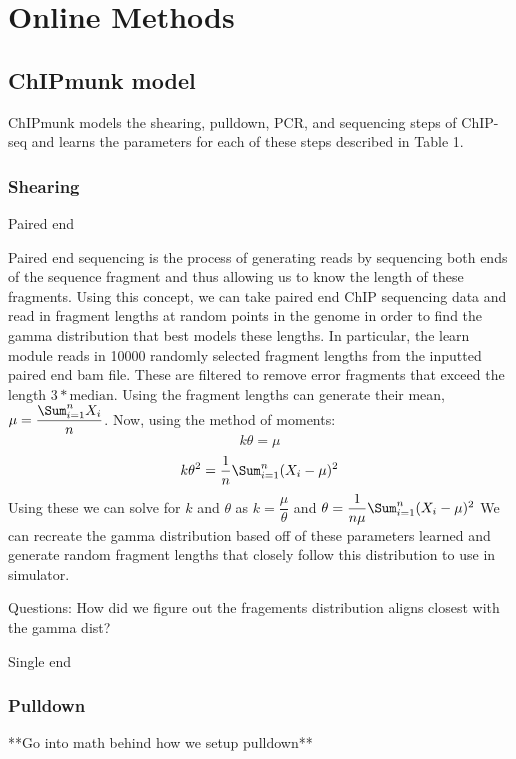 \documentclass[12pt]{article}
\begin{document}
\section*{Online Methods}

\subsection*{ChIPmunk model}

ChIPmunk models the shearing, pulldown, PCR, and sequencing steps of ChIP-seq and learns the parameters for each of these steps described in Table 1. 

\subsubsection*{Shearing}

Paired end

Paired end sequencing is the process of generating reads by sequencing both ends of the sequence fragment and thus allowing us to know the length of these fragments. Using this concept, we can take paired end ChIP sequencing data and read in fragment lengths at random points in the genome in order to find the gamma distribution that best models these lengths. In particular, the learn module reads in 10000 randomly selected fragment lengths from the inputted paired end bam file. These are filtered to remove error fragments that exceed the length $3 * \text{median}$. Using the fragment lengths can generate their mean, $\mu = \dfrac{\Sum_{i=1}^{n}X_i}{n}$. Now, using the method of moments: 
$$k\theta = \mu$$
$$k{\theta}^2 = \dfrac{1}{n}\Sum_{i=1}^n(X_i - \mu)^2$$  
Using these we can solve for $k$ and $\theta$ as $k = \dfrac{\mu}{\theta}$ and $\theta = \dfrac{1}{n\mu}\Sum_{i=1}^{n}(X_i - \mu)^2$
We can recreate the gamma distribution based off of these parameters learned and generate random fragment lengths that closely follow this distribution to use in simulator.

Questions: How did we figure out the fragements distribution aligns closest with the gamma dist?

Single end


\subsubsection*{Pulldown}

**Go into math behind how we setup pulldown**
\end{document}
